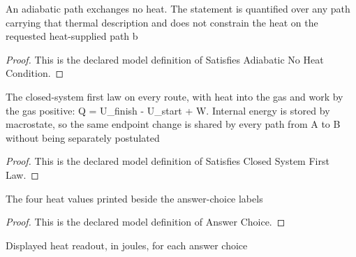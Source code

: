 \begin{definition}
  \label{def:physics:phyx-mini-0356:phyxminiproblems-problemphyxmini0356-satisfiesadiabaticnoheatcondition}
  An adiabatic path exchanges no heat. The statement is quantified over any path carrying that thermal description and does not constrain the heat on the requested heat-supplied path b
\end{definition}
\begin{proof}
  This is the declared model definition of Satisfies Adiabatic No Heat Condition.
\end{proof}
\begin{definition}
  \label{def:physics:phyx-mini-0356:phyxminiproblems-problemphyxmini0356-satisfiesclosedsystemfirstlaw}
  The closed-system first law on every route, with heat into the gas and work by the gas positive: Q = U\_finish - U\_start + W. Internal energy is stored by macrostate, so the same endpoint change is shared by every path from A to B without being separately postulated
\end{definition}
\begin{proof}
  This is the declared model definition of Satisfies Closed System First Law.
\end{proof}
\begin{definition}
  \label{def:physics:phyx-mini-0356:phyxminiproblems-problemphyxmini0356-answerchoice}
  The four heat values printed beside the answer-choice labels
\end{definition}
\begin{proof}
  This is the declared model definition of Answer Choice.
\end{proof}
\begin{definition}
  \label{def:physics:phyx-mini-0356:phyxminiproblems-problemphyxmini0356-displayedheatinjoules}
  Displayed heat readout, in joules, for each answer choice
\end{definition}
